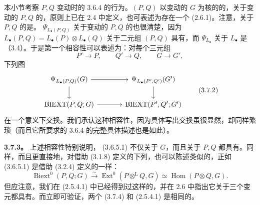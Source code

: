 本小节考察 $P,Q$ 变动时的 3.6.4 的行为。$(P,Q)$ 以变动的 $G$ 为核的的，关于变动的 $P,Q$ 的，原则上已在 2.4 中定义，也可表述为存在一个 (2.6.1)。注意，关于 $P,Q$ 的是。 $\Psi_{L_\bullet(P,Q)}$ 关于变动的 $P,Q$ 的也很清楚，因为 $L_\bullet(P,Q)=L_\bullet(P)\otimes L_\bullet(Q)$ 关于二元组 $(P,Q)$ 具有，而 $\Psi_{L_\bullet}$ 关于 $L_\bullet$ 是（3.4）。于是第一个相容性可以表述为：对每个三元组
\[
P'\longrightarrow P,\qquad Q'\longrightarrow Q,\qquad G\longrightarrow G',\tag{3.7.1}
\]
下列图
\[
\begin{tikzcd}[column sep=large]
\Psi_{L_\bullet(P,Q)}(G)\arrow[r]\arrow[d]&\Psi_{L_\bullet(P',Q')}(G')\arrow[d]\\
\operatorname{BIEXT}(P,Q;G)\arrow[r]&\operatorname{BIEXT}(P',Q';G')
\end{tikzcd}\tag{3.7.2}
\]
在一个意义下交换。我们承认这种相容性，因为具体写出交换虽很显然，却同样繁琐（而且它所要求的 3.6.4 的完整具体描述也是如此）。

\textbf{3.7.3。} 上述相容性特别说明， (3.6.5.1) 不仅关于 $G$，而且关于 $P,Q$ 都具有。同样，而且更直接地，对借助 (3.1.8) 定义的下列，也可以陈述类似的，正如 (3.6.5.1) 是借助 (3.2.4) 定义的一样：
\[
\operatorname{Biext}^0(P,Q;G)\xrightarrow{\sim}
\operatorname{Ext}^0(P\mathbin{\otimes^{\mathrm L}}Q,G)\simeq\operatorname{Hom}(P\otimes Q,G).\tag{3.7.4}
\]
但应注意，我们在 (2.5.4.1) 中已经得到过这样的，并在 2.6 中指出它关于三个变元都具有。而立即可验证，两个 (3.7.4) 和 (2.5.4.1) 是相同的。


